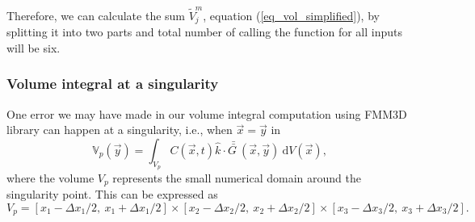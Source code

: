 
%
%
Therefore, we can calculate the sum $\tilde{V}_j^m$, equation (\ref{eq_vol_simplified}), 
by splitting it into two parts and total number of calling the function for all inputs will be six. 
	
\subsubsection{Volume integral at a singularity}
One error we may have made in our volume integral computation using FMM3D library can happen at a singularity, i.e., when $\vec{x} = \vec{y}$ in 
\begin{equation}
\mathbb{V}_p(\vec{y}) = 
 \int_{{V}_p}
	C (\vec{x},t ) \hat{k} \cdot 
	\bar{\bar{G \ }} (\vec{x}, \vec{y} ) 
	\ \text{d}V(\vec{x}),
	\label{eq_vol_int_singular}
\end{equation}
where the volume $V_p$ represents the small numerical domain around the singularity point. This can be expressed as 
\[
V_p = [x_1 - \Delta x_1/2, \ x_1 + \Delta x_1/2]
\times [x_2 - \Delta x_2/2, \ x_2 + \Delta x_2/2]
\times [x_3 - \Delta x_3/2, \ x_3 + \Delta x_3/2].
\]


